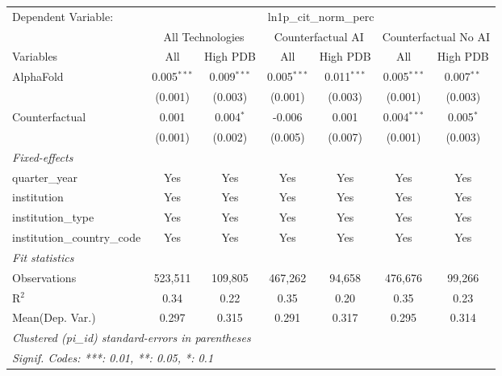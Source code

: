 \begingroup
\centering
\begin{tabular}{lcccccc}
   \tabularnewline \midrule \midrule
   Dependent Variable: & \multicolumn{6}{c}{ln1p\_cit\_norm\_perc}\\
 & \multicolumn{2}{c}{All Technologies} & \multicolumn{2}{c}{Counterfactual AI} & \multicolumn{2}{c}{Counterfactual No AI} \\
\cmidrule(lr){1-1}\cmidrule(lr){2-3} \cmidrule(lr){4-5} \cmidrule(lr){6-7}
Variables & \multicolumn{1}{c}{All} & \multicolumn{1}{c}{High PDB} & \multicolumn{1}{c}{All} & \multicolumn{1}{c}{High PDB} & \multicolumn{1}{c}{All} & \multicolumn{1}{c}{High PDB} \\
\cmidrule(lr){1-1}\cmidrule(lr){2-2} \cmidrule(lr){3-3} \cmidrule(lr){4-4} \cmidrule(lr){5-5} \cmidrule(lr){6-6} \cmidrule(lr){7-7}
   AlphaFold                    & 0.005$^{***}$ & 0.009$^{***}$ & 0.005$^{***}$ & 0.011$^{***}$ & 0.005$^{***}$ & 0.007$^{**}$\\   
                                & (0.001)       & (0.003)       & (0.001)       & (0.003)       & (0.001)       & (0.003)\\   
   Counterfactual               & 0.001         & 0.004$^{*}$   & -0.006        & 0.001         & 0.004$^{***}$ & 0.005$^{*}$\\   
                                & (0.001)       & (0.002)       & (0.005)       & (0.007)       & (0.001)       & (0.003)\\   
   \midrule
   \emph{Fixed-effects}\\
   quarter\_year                & Yes           & Yes           & Yes           & Yes           & Yes           & Yes\\  
   institution                  & Yes           & Yes           & Yes           & Yes           & Yes           & Yes\\  
   institution\_type            & Yes           & Yes           & Yes           & Yes           & Yes           & Yes\\  
   institution\_country\_code   & Yes           & Yes           & Yes           & Yes           & Yes           & Yes\\  
   \midrule
   \emph{Fit statistics}\\
   Observations                 & 523,511       & 109,805       & 467,262       & 94,658        & 476,676       & 99,266\\  
   R$^2$                        & 0.34          & 0.22          & 0.35          & 0.20          & 0.35          & 0.23\\  
Mean(Dep. Var.) & 0.297 & 0.315 & 0.291 & 0.317 & 0.295 & 0.314 \\
   \midrule \midrule
   \multicolumn{7}{l}{\emph{Clustered (pi\_id) standard-errors in parentheses}}\\
   \multicolumn{7}{l}{\emph{Signif. Codes: ***: 0.01, **: 0.05, *: 0.1}}\\
\end{tabular}
\par\endgroup
